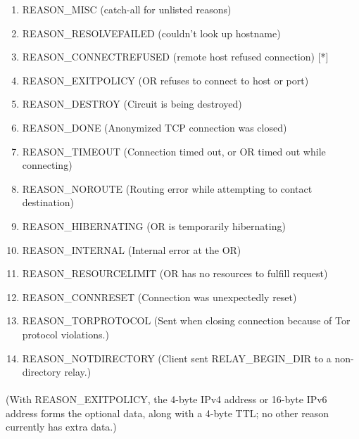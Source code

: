 \begin{enumerate}
    \item REASON\_MISC (catch-all for unlisted reasons)

    \item REASON\_RESOLVEFAILED (couldn't look up hostname)

    \item REASON\_CONNECTREFUSED (remote host refused connection) [*]

    \item REASON\_EXITPOLICY (OR refuses to connect to host or port)

    \item REASON\_DESTROY (Circuit is being destroyed)

    \item REASON\_DONE (Anonymized TCP connection was closed)

    \item REASON\_TIMEOUT (Connection timed out, or OR timed out
    while connecting)

    \item REASON\_NOROUTE (Routing error while attempting to
    contact destination)

    \item REASON\_HIBERNATING (OR is temporarily hibernating)

    \item REASON\_INTERNAL (Internal error at the OR)

    \item REASON\_RESOURCELIMIT (OR has no resources to fulfill request)

    \item REASON\_CONNRESET (Connection was unexpectedly reset)

    \item REASON\_TORPROTOCOL (Sent when closing connection because of
    Tor protocol violations.)

    \item REASON\_NOTDIRECTORY (Client sent RELAY\_BEGIN\_DIR to a
    non-directory relay.)
\end{enumerate}

\paragraph{}
(With REASON\_EXITPOLICY, the 4-byte IPv4 address or 16-byte IPv6 address
forms the optional data, along with a 4-byte TTL; no other reason
currently has extra data.)

